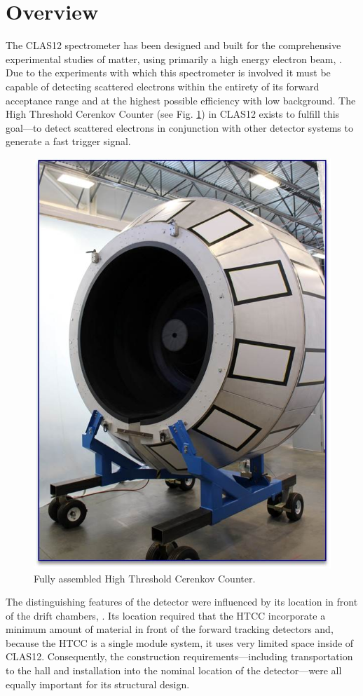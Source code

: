 \section{Overview}

The CLAS12 spectrometer has been designed and built for the comprehensive experimental studies of matter, using primarily a high energy electron beam, \cite{youris}. Due to the experiments with which this spectrometer is involved it must be capable of detecting scattered electrons within the entirety of its forward acceptance range and at the highest possible efficiency with low background. The High Threshold Cerenkov Counter (see Fig. \ref{fig:Picture1}) in CLAS12 exists to fulfill this goal---to detect scattered electrons in conjunction with other detector systems to generate a fast trigger signal. 

\begin{figure}[ht]
    \centering
    \includegraphics[width=0.75\linewidth]{images/Picture1.jpg}
    \caption{Fully assembled High Threshold Cerenkov Counter.}
    \label{fig:Picture1}
\end{figure}
The distinguishing features of the detector were influenced by its location in front of the drift chambers, \cite{youris}.  Its location required that the HTCC incorporate a minimum amount of material in front of the forward tracking detectors and, because the HTCC is a single module system, it uses very limited space inside of CLAS12. Consequently, the construction requirements---including transportation to the hall and installation into the nominal location of the detector---were all equally important for its structural design. 






